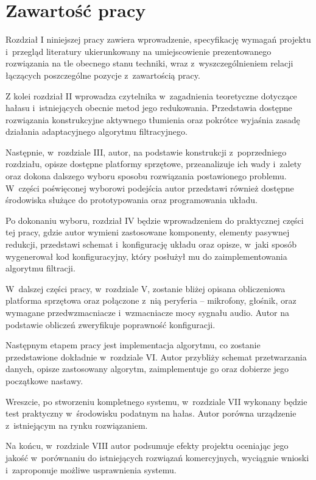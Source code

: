 \section{Zawartość pracy}
\label{sec:zawartoscPracy}
Rozdział I niniejszej pracy zawiera wprowadzenie, specyfikację wymagań projektu i~przegląd literatury ukierunkowany na umiejscowienie prezentowanego rozwiązania na tle obecnego stanu techniki, wraz z~wyszczególnieniem relacji łączących poszczególne pozycje z~zawartością pracy.

Z kolei rozdział II wprowadza czytelnika w~zagadnienia teoretyczne dotyczące hałasu i~istniejących obecnie metod jego redukowania. Przedstawia dostępne rozwiązania konstrukcyjne aktywnego tłumienia oraz pokrótce wyjaśnia zasadę działania adaptacyjnego algorytmu filtracyjnego.

Następnie, w~rozdziale III, autor, na podstawie konstrukcji z~poprzedniego rozdziału, opisze dostępne platformy sprzętowe, przeanalizuje ich wady i~zalety oraz dokona dalszego wyboru sposobu rozwiązania postawionego problemu. W~części poświęconej wyborowi podejścia autor przedstawi również dostępne środowiska służące do prototypowania oraz programowania układu.

Po dokonaniu wyboru, rozdział IV będzie wprowadzeniem do praktycznej części tej pracy, gdzie autor wymieni zastosowane komponenty, elementy pasywnej redukcji, przedstawi schemat i~konfigurację układu oraz opisze, w~jaki sposób wygenerował kod konfiguracyjny, który posłużył mu do zaimplementowania algorytmu filtracji.

W~dalszej części pracy, w~rozdziale V, zostanie bliżej opisana obliczeniowa platforma sprzętowa oraz połączone z~nią peryferia -- mikrofony, głośnik, oraz wymagane przedwzmacniacze i~wzmacniacze mocy sygnału audio. Autor na podstawie obliczeń zweryfikuje poprawność konfiguracji.

Następnym etapem pracy jest implementacja algorytmu, co zostanie przedstawione dokładnie w~rozdziale VI. Autor przybliży schemat przetwarzania danych, opisze zastosowany algorytm, zaimplementuje go oraz dobierze jego początkowe nastawy.

Wreszcie, po stworzeniu kompletnego systemu, w~rozdziale VII wykonany będzie test praktyczny w~środowisku podatnym na hałas. Autor porówna urządzenie z~istniejącym na rynku rozwiązaniem.

Na końcu, w~rozdziale VIII autor podsumuje efekty projektu oceniając jego jakość w~porównaniu do istniejących rozwiązań komercyjnych, wyciągnie wnioski i~zaproponuje możliwe usprawnienia systemu.
